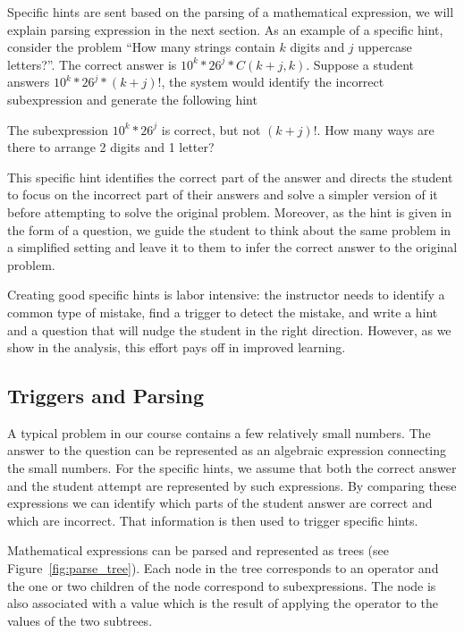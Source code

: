 \documentclass{sigchi}
\begin{document}
Specific hints are sent based on the parsing of a mathematical expression, we will explain parsing expression in the next section. As an example of a specific hint, consider the problem ``How many strings contain $k$ digits and $j$ uppercase letters?''. The correct answer is $10^k*26^j*C(k+j,k)$. Suppose a student answers $10^k*26^j*(k+j)!$, the system would identify the incorrect subexpression and generate the following hint

\begin{displayquote}
The subexpression $10^k*26^j$ is correct, but not $(k+j)!$. How many
ways are there to arrange 2 digits and 1 letter? 
\end{displayquote}

This specific hint identifies the correct part of the answer and
directs the student to focus on the incorrect part of their answers and solve a simpler version of it before attempting to solve the original problem. Moreover, as the hint is given in the form of a question, we guide the student to think about the same problem in a simplified setting and leave it to them to infer the correct answer to the original problem. 

Creating good specific hints is labor intensive: the instructor needs to identify a common type of mistake, find a trigger to detect the mistake, and write a hint and a question that will nudge the student in the right direction. However, as we show in the analysis, this effort pays off in improved learning.

\subsection*{Triggers and Parsing}

A typical problem in our course contains a few relatively small numbers. The answer to the question can be represented as an algebraic expression connecting the small numbers. For the specific hints, we assume that both the correct answer and the student attempt are represented by such expressions. By comparing these expressions we can identify which
parts of the student answer are correct and which are incorrect. That information is then used to trigger specific hints.

Mathematical expressions can be parsed and represented as trees (see Figure~\ref{fig:parse_tree}). Each node in the tree corresponds to an operator and the one or two children of the node correspond to subexpressions. The node is also associated with a value which is the result of applying the operator to the values of the two subtrees.
\end{document}
